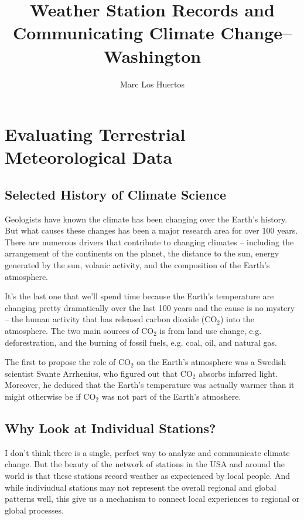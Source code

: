 \documentclass{article}
\title{Weather Station Records and Communicating Climate Change--Washington}
\author{Marc Los Huertos}
\begin{document}
\maketitle

\tableofcontents

\section{Evaluating Terrestrial Meteorological Data}

\subsection{Selected History of Climate Science}

Geologists have known the climate has been changing over the Earth's history. But what causes these changes has been a major research area for over 100 years. There are numerous drivers that contribute to changing climates -- including the arrangement of the continents on the planet, the distance to the sun, energy generated by the sun, volanic activity, and the composition of the Earth's atmosphere. 

It's the last one that we'll spend time because the Earth's temperature are changing pretty dramatically over the last 100 years and the cause is no mystery -- the human activity that has released carbon dioxide (CO$_2$) into the atmosphere. The two main sources of CO$_2$ is from land use change, e.g. deforestration, and the burning of fossil fuels, e.g. coal, oil, and natural gas. 

The first to propose the role of CO$_2$ on the Earth's atmosphere was a Swedish scientist Svante Arrhenius, who figured out that CO$_2$ absorbs infarred light. Moreover, he deduced that the Earth's temperature was actually warmer than it might otherwise be if CO$_2$ was not part of the Earth's atmoshere. 

\subsection{Why Look at Individual Stations?}

I don't think there is a single, perfect way to analyze and communicate climate change. But the beauty of the network of stations in the USA and around the world is that these stations record weather as expecienced by local people. And while indiviudual stations may not represent the overall regional and global patterns well, this give us a mechanism to connect local experiences to regional or global processes. 
\end{document}
